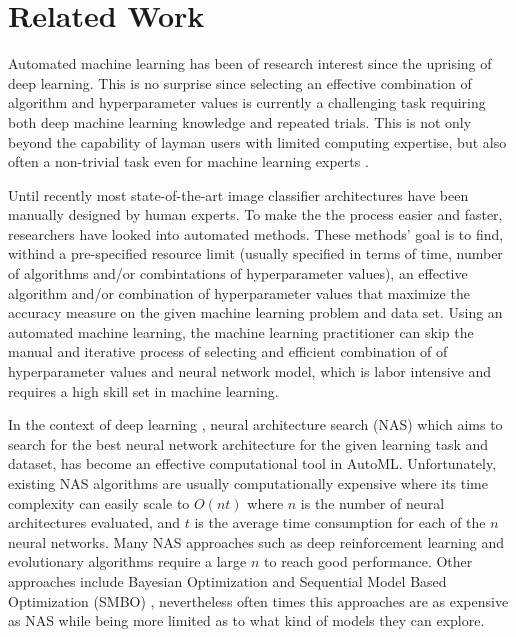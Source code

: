 \documentclass[journal]{IEEEtran}
\begin{document}

\section{Related Work}
\label{sec:literature_review}

Automated machine learning has been of research interest since the uprising of deep learning. This is no surprise since selecting an effective combination of algorithm and hyperparameter values is currently a challenging task requiring both deep machine learning knowledge and repeated trials. This is not only beyond the capability of layman users with limited computing expertise, but also often a non-trivial task even for machine learning experts \cite{sparks2015}. 

Until recently most state-of-the-art image classifier architectures have been manually designed by human experts. To make the the process easier and faster, researchers have looked into automated methods. These methods' goal is to find, withind a pre-specified resource limit (usually specified in terms of time, number of algorithms and/or combintations of hyperparameter values), an effective algorithm and/or combination of hyperparameter values that maximize the accuracy measure on the given machine learning problem and data set. Using an automated machine learning, the machine learning practitioner can skip the manual and iterative process of selecting and efficient combination of of hyperparameter values and neural network model, which is labor intensive and requires a high skill set in machine learning.

In the context of deep learning , neural architecture search (NAS) which aims to search for the best neural network architecture for the given learning task and dataset, has become an effective computational tool in AutoML. Unfortunately, existing NAS algorithms are usually computationally expensive where its time complexity can easily scale to $O(nt)$ where $n$ is the number of neural architectures evaluated, and $t$ is the average time consumption for each of the $n$ neural networks. Many NAS approaches such as deep reinforcement learning  \cite{Zoph2016, Baker2016, Zhong2017} and evolutionary algorithms \cite{Liu2018, Liang2017, Angeline1994, Suganuma2017} require a large $n$ to reach good performance. Other approaches include Bayesian Optimization \cite{Thornton2016, Brochu2010} and Sequential Model Based Optimization (SMBO) \cite{Hutter2011, Feurer2015}, nevertheless often times this approaches are as expensive as NAS while being more limited as to what kind of models they can explore.
\end{document}
